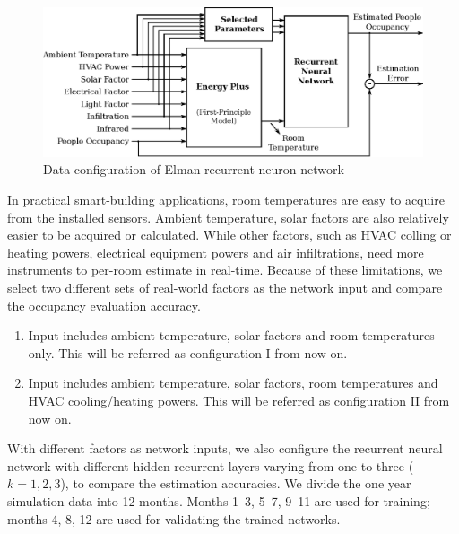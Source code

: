 \begin{figure}[t]
    \centering
    \includegraphics[width=0.9\columnwidth]{figs/rnn/data-flow.eps}
    \caption{Data configuration of Elman recurrent neuron network}
    \label{fig:data-flow}
\end{figure}

In practical smart-building applications, room temperatures are easy to acquire
from the installed sensors. Ambient temperature, solar factors are also
relatively easier to be acquired or calculated. While other factors, such as
HVAC colling or heating powers, electrical equipment powers and air
infiltrations, need more instruments to per-room estimate in real-time. Because
of these limitations, we select two different sets of real-world factors as the
network input and compare the occupancy evaluation accuracy.
\begin{enumerate}
    \item Input includes ambient temperature, solar factors and room
    temperatures only. This will be referred as configuration I from now on.

    \item Input includes ambient temperature, solar factors, room temperatures
    and HVAC cooling\slash{}heating powers. This will be referred as configuration II from now on.
\end{enumerate}
With different factors as network inputs, we also configure the recurrent
neural network with different hidden recurrent layers varying from one to
three ($k=1,2,3$), to compare the estimation accuracies. We divide the one year
simulation data into 12 months. Months 1--3, 5--7, 9--11 are used for training;
months 4, 8, 12 are used for validating the trained networks.

